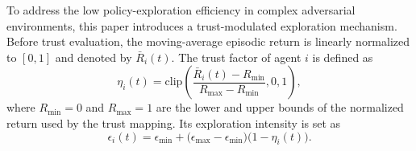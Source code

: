 \documentclass{cja}
\begin{document}
To address the low policy-exploration efficiency in complex adversarial environments, this paper introduces a trust-modulated exploration mechanism. Before trust evaluation, the moving-average episodic return is linearly normalized to $[0,1]$ and denoted by $\bar R_i(t)$. The trust factor of agent $i$ is defined as
\begin{equation}
\eta_i(t)
=
\mathrm{clip}
\left(
\frac{\bar R_i(t)-R_{\min}}{R_{\max}-R_{\min}},
0,1
\right),
\end{equation}
where $R_{\min}=0$ and $R_{\max}=1$ are the lower and upper bounds of the normalized return used by the trust mapping. Its exploration intensity is set as
\begin{equation}
\epsilon_i(t)
=
\epsilon_{\min}
+
\bigl(\epsilon_{\max}-\epsilon_{\min}\bigr)
\bigl(1-\eta_i(t)\bigr).
\end{equation}
\end{document}
